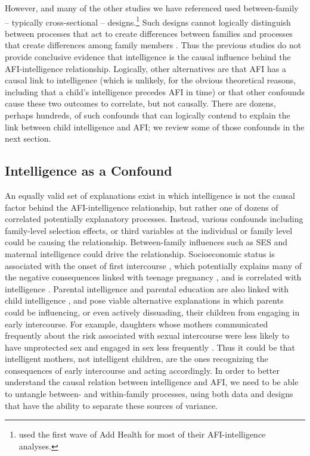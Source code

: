 However, \citet{halpern2000smart} and many of the other studies we have referenced \citep[e.g.,][]{mathews2009predictors,miller1997timing,Paul2000} used between-family -- typically cross-sectional -- designs.\footnote{\citet{halpern2000smart} used the first wave of Add Health for most of their AFI-intelligence analyses.} Such designs cannot logically distinguish between processes that act to create differences between families and processes that create differences among family members \citep{Lahey2010,Rodgers2000}. Thus the previous studies do not provide conclusive evidence that intelligence is the causal influence behind the AFI-intelligence relationship. Logically, other alternatives are that AFI has a causal link to intelligence (which is unlikely, for the obvious theoretical reasons, including that a child's intelligence precedes AFI in time) or that other confounds cause these two outcomes to correlate, but not causally. There are dozens, perhaps hundreds, of such confounds that can logically contend to explain the link between child intelligence and AFI; we review some of those confounds in the next section.
%
\subsection{Intelligence as a Confound}
An equally valid set of explanations exist in which intelligence is not the causal factor behind the AFI-intelligence relationship, but rather one of dozens of correlated potentially explanatory processes. Instead, various confounds including family-level selection effects, or third variables at the individual or family level could be causing the relationship. Between-family influences such as SES and maternal intelligence could drive the relationship. Socioeconomic status is associated with the onset of first intercourse \citep{Lammers2000}, which potentially explains many of the negative consequences linked with teenage pregnancy \citep{geronimus1992socioeconomic}, and is correlated with intelligence \citep{murray1998income,Neisser1996,Strenze2007}. Parental intelligence and parental education are also linked with child intelligence \citep{Bouchard2004,devlin1997heritability,mercy1982familial}, and pose viable alternative explanations in which parents could be influencing, or even actively  dissuading, their children from engaging in early intercourse. For example, daughters whose mothers communicated frequently about the risk associated with sexual intercourse were less likely to have unprotected sex and engaged in sex less frequently \citep{hutchinson2003role}. Thus it could be that intelligent mothers, not intelligent children, are the ones recognizing the consequences of early intercourse and acting accordingly. In order to better understand the causal relation between intelligence and AFI, we need to be able to untangle between- and within-family processes, using both data and designs that have the ability to separate these sources of variance.

